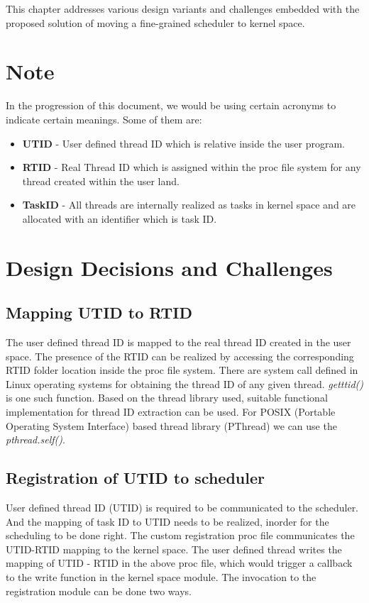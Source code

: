 This chapter addresses various design variants and challenges embedded with the proposed solution of moving a fine-grained scheduler to kernel space. 

\section*{Note}
In the progression of this document, we would be using certain acronyms to indicate certain meanings. 
Some of them are:
\begin{itemize}
\item \textbf{UTID} - User defined thread ID which is relative inside the user program. 
\item \textbf{RTID} - Real Thread ID which is assigned within the proc file system for any thread created within the user land. 
\item \textbf{TaskID} - All threads are internally realized as tasks in kernel space and are allocated with an identifier which is task ID.
\end{itemize}

\section{Design Decisions and Challenges}

\subsection{Mapping UTID to RTID}

The user defined thread ID is mapped to the real thread ID created in the user space. 
The presence of the RTID can be realized by accessing the corresponding RTID folder location inside the proc file system. 
There are system call defined in Linux operating systems for obtaining the thread ID of any given thread. 
\emph{getttid()} is one such function. 
Based on the thread library used, suitable functional implementation for thread ID extraction can be used. 
For POSIX (Portable Operating System Interface) based thread library (PThread) we can use the \emph{pthread.self()}.

\subsection{Registration of UTID to scheduler}

User defined thread ID (UTID) is required to be communicated to the scheduler. 
And the mapping of task ID to UTID needs to be realized, inorder for the scheduling to be done right. 
The custom registration proc file communicates the UTID-RTID mapping to the kernel space. 
The user defined thread writes the mapping of UTID - RTID in the above proc file, which would trigger a callback to the write function in the kernel space module. 
The invocation to the registration module can be done two ways.

